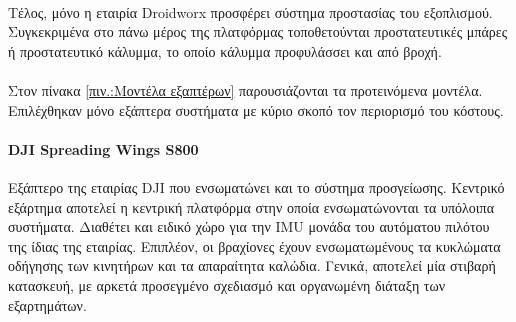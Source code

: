 \documentclass[a4paper, 12pt, twoside]{report}
\begin{document}
{{{{{{			\paragraph{}{Τέλος, μόνο η εταιρία Droidworx προσφέρει σύστημα προστασίας του εξοπλισμού. Συγκεκριμένα στο πάνω μέρος της πλατφόρμας τοποθετούνται προστατευτικές μπάρες ή προστατευτικό κάλυμμα, το οποίο κάλυμμα προφυλάσσει και από βροχή.
			}
			
			\paragraph{}{Στον πίνακα \ref{πιν.:Μοντέλα εξαπτέρων} παρουσιάζονται τα προτεινόμενα μοντέλα. Επιλέχθηκαν μόνο εξάπτερα συστήματα με κύριο σκοπό τον περιορισμό του κόστους.
			}
			\paragraph{DJI Spreading Wings S800}{Εξάπτερο της εταιρίας DJI που ενσωματώνει και το σύστημα προσγείωσης. Κεντρικό εξάρτημα αποτελεί η κεντρική πλατφόρμα στην οποία ενσωματώνονται τα υπόλοιπα συστήματα. Διαθέτει και ειδικό χώρο για την IMU μονάδα του αυτόματου πιλότου της ίδιας της εταιρίας. Επιπλέον, οι βραχίονες έχουν ενσωματωμένους τα κυκλώματα οδήγησης των κινητήρων και τα απαραίτητα καλώδια. Γενικά, αποτελεί μία στιβαρή κατασκευή, με αρκετά προσεγμένο σχεδιασμό και οργανωμένη διάταξη των εξαρτημάτων.
			}
}}}}}}
\end{document}
